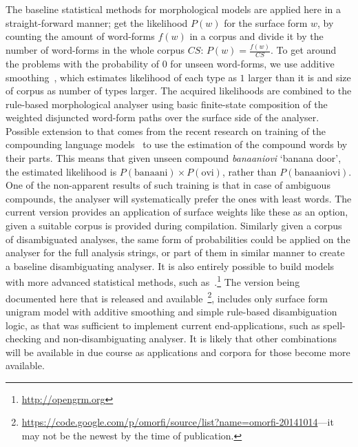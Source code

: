 \documentclass[a4paper,12pt]{article}
\begin{document}
The baseline statistical methods for morphological models are applied here in a
straight-forward manner; get the likelihood $P(w)$ for the surface form $w$, by
counting the amount of word-forms $f(w)$ in a corpus and divide it by the
number of word-forms in the whole corpus $CS$: $P(w) = \frac{f(w)}{CS}$.  To
get around the problems with the probability of $0$ for unseen word-forms, we
use additive smoothing~\citep{chen1999empirical}, which estimates likelihood of
each type as $1$ larger than it is and size of corpus as number of types
larger. The acquired likelihoods are combined to the rule-based morphological
analyser using basic finite-state composition of the weighted disjuncted
word-form paths over the surface side of the analyser. Possible extension to
that comes from the recent research on training of the compounding language
models~\citep{pirinen2009weighting} to use the estimation of the compound words
by their parts. This means that given unseen compound \emph{banaaniovi} `banana door', the
estimated likelihood is $P(\mathrm{banaani}) \times P(\mathrm{ovi})$, rather
than $P(\mathrm{banaaniovi})$. One of the non-apparent results of such training
is that in case of ambiguous compounds, the analyser will systematically prefer
the ones with least words. The current version provides an application of
surface weights like these as an option, given a suitable corpus is provided
during compilation. Similarly given a corpus of disambiguated analyses, the
same form of probabilities could be applied on the analyser for the full
analysis strings, or part of them in similar manner to create a baseline
disambiguating analyser. It is also entirely possible to build models with more
advanced statistical methods, such
as~\citet{opengrm}.\footnote{\url{http://opengrm.org}} The version being
documented here that is released and available~\footnote{\url{https://code.google.com/p/omorfi/source/list?name=omorfi-20141014}---it may not be the newest by the time of publication.},
includes only surface form unigram model with additive smoothing and simple
rule-based disambiguation logic, as that was sufficient to implement current
end-applications, such as spell-checking and non-disambiguating analyser. It is
likely that other combinations will be available in due course as applications
and corpora for those become more available.
\end{document}
